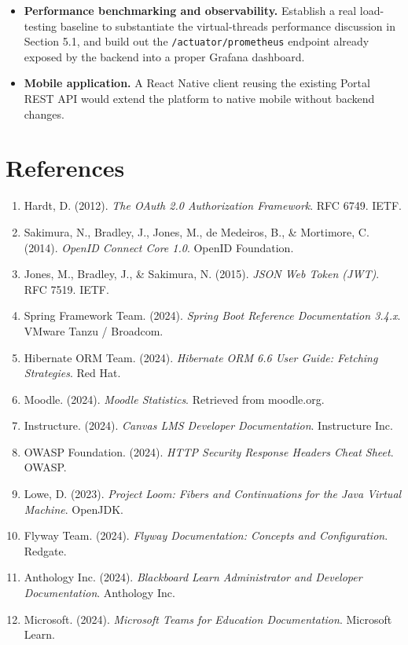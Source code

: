 \documentclass[12pt,a4paper]{report}
\begin{document}
\begin{itemize}
this repository, when it is in fact a separate repository; they have
never successfully deployed and should be redesigned for the correct
two-repository topology (either a dual checkout in one pipeline or a
separate pipeline per repository) rather than left in a broken state.
\item \textbf{Performance benchmarking and observability.} Establish a
real load-testing baseline to substantiate the virtual-threads
performance discussion in Section 5.1, and build out the
\texttt{/actuator/prometheus} endpoint already exposed by the backend
into a proper Grafana dashboard.
\item \textbf{Mobile application.} A React Native client reusing the
existing Portal REST API would extend the platform to native mobile
without backend changes.
\end{itemize}

\chapter*{References}

\begin{enumerate}
\item Hardt, D. (2012). \emph{The OAuth 2.0 Authorization Framework}. RFC 6749. IETF.
\item Sakimura, N., Bradley, J., Jones, M., de Medeiros, B., \& Mortimore, C. (2014). \emph{OpenID Connect Core 1.0}. OpenID Foundation.
\item Jones, M., Bradley, J., \& Sakimura, N. (2015). \emph{JSON Web Token (JWT)}. RFC 7519. IETF.
\item Spring Framework Team. (2024). \emph{Spring Boot Reference Documentation 3.4.x}. VMware Tanzu / Broadcom.
\item Hibernate ORM Team. (2024). \emph{Hibernate ORM 6.6 User Guide: Fetching Strategies}. Red Hat.
\item Moodle. (2024). \emph{Moodle Statistics}. Retrieved from moodle.org.
\item Instructure. (2024). \emph{Canvas LMS Developer Documentation}. Instructure Inc.
\item OWASP Foundation. (2024). \emph{HTTP Security Response Headers Cheat Sheet}. OWASP.
\item Lowe, D. (2023). \emph{Project Loom: Fibers and Continuations for the Java Virtual Machine}. OpenJDK.
\item Flyway Team. (2024). \emph{Flyway Documentation: Concepts and Configuration}. Redgate.
\item Anthology Inc. (2024). \emph{Blackboard Learn Administrator and Developer Documentation}. Anthology Inc.
\item Microsoft. (2024). \emph{Microsoft Teams for Education Documentation}. Microsoft Learn.
\end{enumerate}
\end{document}
